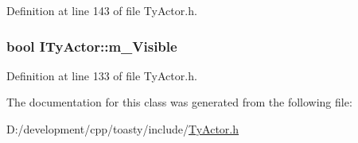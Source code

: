 Definition at line 143 of file TyActor.h.

\hypertarget{class_i_ty_actor_a1019d46cd7502694e5f69c7c4c7be23e}{
\subsubsection[{m\_\-Visible}]{\setlength{\rightskip}{0pt plus 5cm}bool {\bf ITyActor::m\_\-Visible}}}
\label{class_i_ty_actor_a1019d46cd7502694e5f69c7c4c7be23e}


Definition at line 133 of file TyActor.h.



The documentation for this class was generated from the following file:\begin{DoxyCompactItemize}
\item 
D:/development/cpp/toasty/include/\hyperlink{_ty_actor_8h}{TyActor.h}\end{DoxyCompactItemize}
